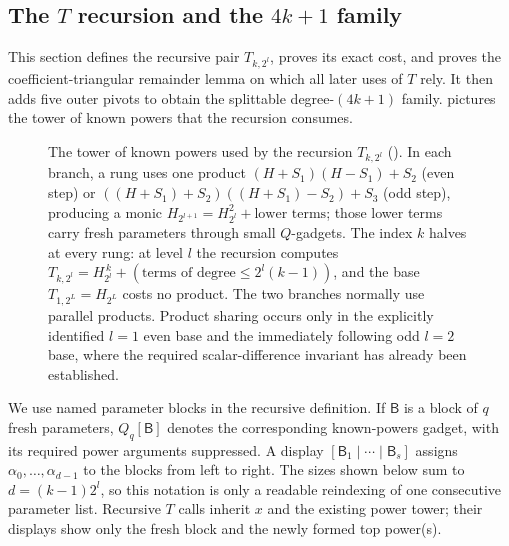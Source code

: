 \subsection{The \texorpdfstring{$T$}{T} recursion and the \texorpdfstring{$4k+1$}{4k+1} family}
\label{sec:splittable-4k+1}
This section defines the recursive pair $T_{k,2^l}$, proves its exact cost,
and proves the coefficient-triangular remainder lemma on which all later uses
of $T$ rely.  It then adds five outer pivots to obtain the splittable
degree-$(4k+1)$ family.   pictures the tower of known
powers that the recursion consumes.

\begin{figure}[H]
  \centering
  \resizebox{\textwidth}{!}{}
  \caption{The tower of known powers used by the recursion $T_{k,2^l}$ ().
  In each branch, a rung uses one product
  $(H+S_1)(H-S_1)+S_2$ (even step) or
  $((H+S_1)+S_2)((H+S_1)-S_2)+S_3$ (odd step), producing a monic
  $H_{2^{l+1}}=H_{2^l}^2+\text{lower terms}$; those lower terms carry fresh
  parameters through small $Q$-gadgets.  The index $k$ halves at every rung:
  at level $l$ the recursion computes
  $T_{k,2^l}=H_{2^l}^{\,k}+(\text{terms of degree}\le 2^l(k-1))$, and the
  base $T_{1,2^L}=H_{2^L}$ costs no product.
  The two branches normally use parallel products.  Product sharing occurs
  only in the explicitly identified $l=1$ even base and the immediately
  following odd $l=2$ base, where the required scalar-difference invariant
  has already been established.}
  \label{fig:T-tower}
\end{figure}

We use named parameter blocks in the recursive definition.  If $\mathsf B$
is a block of $q$ fresh parameters, $Q_q[\mathsf B]$ denotes the corresponding
known-powers gadget, with its required power arguments suppressed.  A display
$[\mathsf B_1\mid\cdots\mid\mathsf B_s]$ assigns
$\alpha_0,\ldots,\alpha_{d-1}$ to the blocks from left to right.  The sizes
shown below sum to $d=(k-1)2^l$, so this notation is only a readable
reindexing of one consecutive parameter list.  Recursive $T$ calls inherit
$x$ and the existing power tower; their displays show only the fresh block
and the newly formed top power(s).

